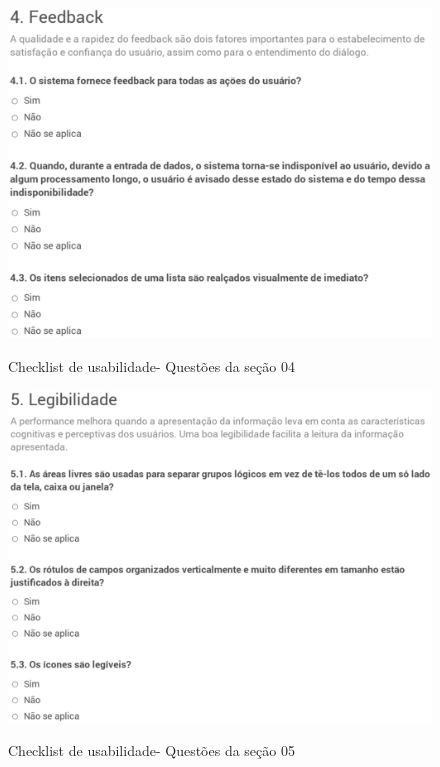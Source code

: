	\begin{figure}[!h]
    	\centering
    	\includegraphics[keepaspectratio=true,scale=0.45]
      		{figuras/check04.eps}
    	\label{check04}
		\caption{Checklist de usabilidade- Questões da seção 04}
	\end{figure}

	\begin{figure}[!h]
    	\centering
    	\includegraphics[keepaspectratio=true,scale=0.45]
      		{figuras/check05.eps}
    	\label{check04}
		\caption{Checklist de usabilidade- Questões da seção 05}
	\end{figure}

